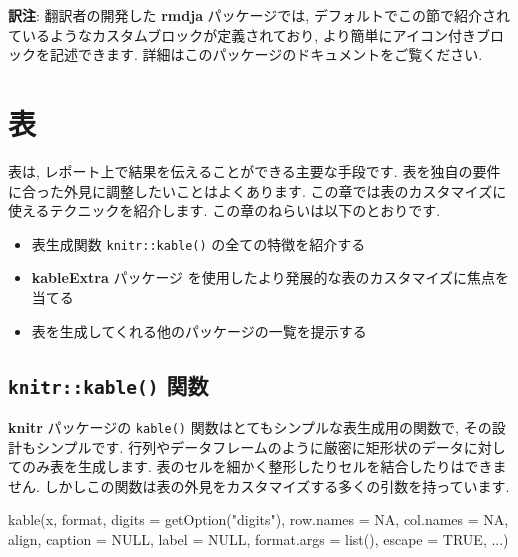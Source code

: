 \documentclass[
  11pt,
  lualatex,
  ja=standard]{bxjsreport}
\newenvironment{Shaded}{\begin{snugshade}}{\end{snugshade}}
\newcommand{\AttributeTok}[1]{\textcolor[rgb]{0.77,0.63,0.00}{#1}}
\newcommand{\ConstantTok}[1]{\textcolor[rgb]{0.00,0.00,0.00}{#1}}
\newcommand{\FunctionTok}[1]{\textcolor[rgb]{0.00,0.00,0.00}{#1}}
\newcommand{\NormalTok}[1]{#1}
\newcommand{\StringTok}[1]{\textcolor[rgb]{0.31,0.60,0.02}{#1}}
\providecommand{\tightlist}{%
  \setlength{\itemsep}{0pt}\setlength{\parskip}{0pt}}
\begin{document}
\textbf{訳注}: 翻訳者の開発した \textbf{rmdja} パッケージでは, デフォルトでこの節で紹介されているようなカスタムブロックが定義されており, より簡単にアイコン付きブロックを記述できます. 詳細はこのパッケージのドキュメントをご覧ください.

\hypertarget{tables}{%
\chapter{表}\label{tables}}

表は, レポート上で結果を伝えることができる主要な手段です. 表を独自の要件に合った外見に調整したいことはよくあります. この章では表のカスタマイズに使えるテクニックを紹介します. この章のねらいは以下のとおりです.

\begin{itemize}
\tightlist
\item
  表生成関数 \texttt{knitr::kable()} の全ての特徴を紹介する
\item
  \textbf{kableExtra} パッケージ \autocite{R-kableExtra} を使用したより発展的な表のカスタマイズに焦点を当てる
\item
  表を生成してくれる他のパッケージの一覧を提示する
\end{itemize}

\hypertarget{kable}{%
\section{\texorpdfstring{\texttt{knitr::kable()} 関数}{knitr::kable() 関数}}\label{kable}}

\textbf{knitr} パッケージの \texttt{kable()} 関数はとてもシンプルな表生成用の関数で, その設計もシンプルです. 行列やデータフレームのように厳密に矩形状のデータに対してのみ表を生成します. 表のセルを細かく整形したりセルを結合したりはできません. しかしこの関数は表の外見をカスタマイズする多くの引数を持っています.

\begin{Shaded}
\begin{Highlighting}[numbers=left,,]
\FunctionTok{kable}\NormalTok{(x, format, }\AttributeTok{digits =} \FunctionTok{getOption}\NormalTok{(}\StringTok{"digits"}\NormalTok{), }\AttributeTok{row.names =} \ConstantTok{NA}\NormalTok{, }
  \AttributeTok{col.names =} \ConstantTok{NA}\NormalTok{, align, }\AttributeTok{caption =} \ConstantTok{NULL}\NormalTok{, }\AttributeTok{label =} \ConstantTok{NULL}\NormalTok{, }
  \AttributeTok{format.args =} \FunctionTok{list}\NormalTok{(), }\AttributeTok{escape =} \ConstantTok{TRUE}\NormalTok{, ...)}
\end{Highlighting}
\end{Shaded}
\end{document}
